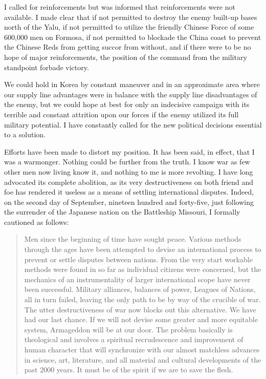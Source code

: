 \documentclass[a4paper]{amsbook}
\begin{document}
I called for reinforcements but was informed that reinforcements were not available. I made clear that if not permitted to destroy the enemy built-up bases north of the Yalu, if not permitted to utilize the friendly Chinese Force of some 600,000 men on Formosa, if not permitted to blockade the China coast to prevent the Chinese Reds from getting succor from without, and if there were to be no hope of major reinforcements, the position of the command from the military standpoint forbade victory.

We could hold in Korea by constant maneuver and in an approximate area where our supply line advantages were in balance with the supply line disadvantages of the enemy, but we could hope at best for only an indecisive campaign with its terrible and constant attrition upon our forces if the enemy utilized its full military potential. I have constantly called for the new political decisions essential to a solution.

Efforts have been made to distort my position. It has been said, in effect, that I was a warmonger. Nothing could be further from the truth. I know war as few other men now living know it, and nothing to me is more revolting. I have long advocated its complete abolition, as its very destructiveness on both friend and foe has rendered it useless as a means of settling international disputes. Indeed, on the second day of September, nineteen hundred and forty-five, just following the surrender of the Japanese nation on the Battleship Missouri, I formally cautioned as follows:

\begin{quote}Men since the beginning of time have sought peace. Various methods through the ages have been attempted to devise an international process to prevent or settle disputes between nations. From the very start workable methods were found in so far as individual citizens were concerned, but the mechanics of an instrumentality of larger international scope have never been successful. Military alliances, balances of power, Leagues of Nations, all in turn failed, leaving the only path to be by way of the crucible of war. The utter  destructiveness of war now blocks out this alternative. We have had our last chance. If we will not devise some greater and more equitable system, Armageddon will be at our door. The problem basically is theological and involves a spiritual recrudescence and improvement of human character that will synchronize with our almost matchless advances in science, art, literature, and all material and cultural developments of the past 2000 years. It must be of the spirit if we are to save the flesh.\end{quote}
\end{document}
